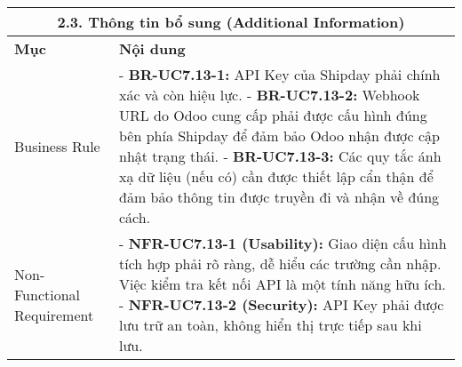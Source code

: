\begin{longtable}{|m{4cm}|p{11cm}|}
\hline
\multicolumn{2}{|c|}{\textbf{2.3. Thông tin bổ sung (Additional Information)}} \\
\hline
\textbf{Mục} & \textbf{Nội dung} \\
\hline
Business Rule & - \textbf{BR-UC7.13-1:} API Key của Shipday phải chính xác và còn hiệu lực. \newline - \textbf{BR-UC7.13-2:} Webhook URL do Odoo cung cấp phải được cấu hình đúng bên phía Shipday để đảm bảo Odoo nhận được cập nhật trạng thái. \newline - \textbf{BR-UC7.13-3:} Các quy tắc ánh xạ dữ liệu (nếu có) cần được thiết lập cẩn thận để đảm bảo thông tin được truyền đi và nhận về đúng cách. \\
\hline
Non-Functional Requirement & - \textbf{NFR-UC7.13-1 (Usability):} Giao diện cấu hình tích hợp phải rõ ràng, dễ hiểu các trường cần nhập. Việc kiểm tra kết nối API là một tính năng hữu ích. \newline - \textbf{NFR-UC7.13-2 (Security):} API Key phải được lưu trữ an toàn, không hiển thị trực tiếp sau khi lưu. \\
\hline
\end{longtable}

